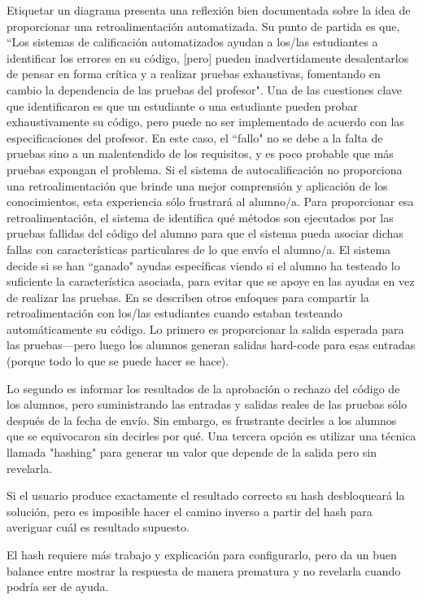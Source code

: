\begin{aside}{Etiquetar un diagrama}
\cite{Buff2015} presenta una reflexión bien documentada sobre la idea de proporcionar una retroalimentación automatizada.
Su punto de partida es que, 
``Los sistemas de calificación automatizados ayudan a los/las estudiantes a identificar los errores en su código, 
[pero] pueden inadvertidamente desalentarlos de pensar en forma crítica y a realizar pruebas exhaustivas, 
fomentando en cambio  la dependencia de las pruebas del profesor".
Una de las cuestiones clave que identificaron es que un estudiante o una estudiante pueden probar exhaustivamente su código, pero puede no ser implementado de acuerdo con las especificaciones del profesor.
En este caso, 
el ``fallo" no se debe a la falta de pruebas sino a un malentendido de los requisitos, y es poco probable que más pruebas expongan el problema.
Si el sistema de autocalificación no proporciona una retroalimentación que brinde una mejor comprensión y aplicación de los conocimientos, esta experiencia sólo frustrará al alumno/a.
Para proporcionar esa retroalimentación, 
el sistema de \cite{Buff2015} identifica qué métodos son ejecutados por las pruebas fallidas del código del alumno 
para que el sistema pueda asociar dichas fallas con características particulares de lo que envío el alumno/a.
El sistema decide si se han ``ganado" ayudas específicas viendo si el alumno ha testeado lo suficiente la característica asociada, para evitar que se apoye en las ayudas en vez de realizar las pruebas.
En \cite{Srid2016} se describen otros enfoques para compartir la retroalimentación con los/las estudiantes 
cuando  estaban testeando automáticamente su código.
Lo primero es proporcionar la salida esperada para las pruebas---pero 
luego los alumnos generan salidas hard-code para esas entradas 
(porque todo lo que se puede hacer se hace).

Lo segundo es informar  los resultados de la aprobación o rechazo del código de los alumnos, 
pero suministrando las entradas y salidas reales de las pruebas sólo después de la fecha de envío.
Sin embargo, 
es frustrante decirles a los alumnos que se equivocaron sin decirles por qué.
Una tercera opción es utilizar una técnica llamada "hashing" para generar un valor que depende de la salida pero sin revelarla.

Si el usuario produce exactamente el resultado correcto
su hash desbloqueará la solución, 
pero es imposible hacer el camino inverso a partir del hash para averiguar cuál es resultado supuesto.

El hash requiere más trabajo y explicación para configurarlo, 
pero da un buen balance entre mostrar la respuesta de manera prematura y no revelarla cuando podría ser de ayuda.


\end{aside}

